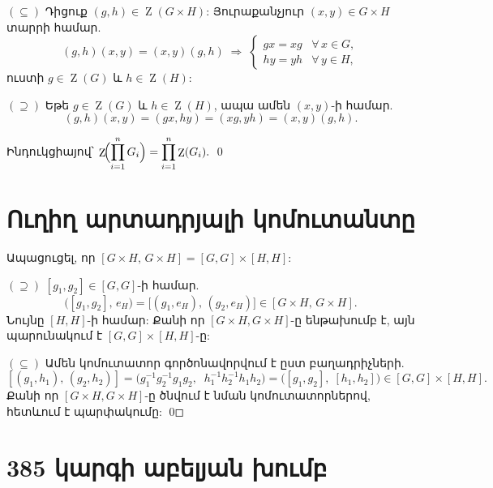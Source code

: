 \documentclass[12pt,a4paper]{article}
\newcommand{\armtext}{} %
\newenvironment{problem}{\begin{mdframed}[style=problemstyle]\armtext}{\end{mdframed}}
\newenvironment{sol}{\begin{mdframed}[style=solstyle]\armtext}{\end{mdframed}}
\DeclareMathOperator{\Cent}{Z}
\begin{document}
\begin{sol}
\noindent$(\subseteq)$\;
Դիցուք $(g,h) \in \Cent(G \times H)$:
Յուրաքանչյուր $(x,y) \in G \times H$ տարրի համար.
\[
  (g,h)(x,y) = (x,y)(g,h)
  \;\Longrightarrow\;
  \begin{cases} gx = xg & \forall\, x \in G,\\[2pt] hy = yh & \forall\, y \in H, \end{cases}
\]
ուստի $g \in \Cent(G)$ և $h \in \Cent(H)$:

\medskip
\noindent$(\supseteq)$\;
Եթե $g \in \Cent(G)$ և $h \in \Cent(H)$, ապա ամեն $(x,y)$-ի համար.
\[
  (g,h)(x,y) = (gx,hy) = (xg,yh) = (x,y)(g,h).
\]

Ինդուկցիայով՝ $\displaystyle\Cent\!\Bigl(\prod_{i=1}^{n} G_i\Bigr) = \prod_{i=1}^{n} \Cent(G_i).$ \qed
\end{sol}

\bigskip
\section{\armtext{Ուղիղ արտադրյալի կոմուտանտը}}

\begin{problem}
Ապացուցել, որ $[G \times H,\, G \times H] = [G,G] \times [H,H]$:
\end{problem}

\begin{sol}
\noindent$(\supseteq)$\;
$[g_1,g_2] \in [G,G]$-ի համար.
\[
  \bigl([g_1,g_2],\, e_H\bigr)
  = \bigl[(g_1,e_H),\,(g_2,e_H)\bigr]
  \in [G \times H,\, G \times H].
\]
Նույնը $[H,H]$-ի համար: Քանի որ $[G\times H, G\times H]$-ը ենթախումբ է, այն
պարունակում է $[G,G] \times [H,H]$-ը:

\medskip
\noindent$(\subseteq)$\;
Ամեն կոմուտատոր գործոնավորվում է ըստ բաղադրիչների.
\[
  [(g_1,h_1),\,(g_2,h_2)]
  = \bigl(g_1^{-1}g_2^{-1}g_1 g_2,\;\; h_1^{-1}h_2^{-1}h_1 h_2\bigr)
  = \bigl([g_1,g_2],\;[h_1,h_2]\bigr)
  \in [G,G] \times [H,H].
\]
Քանի որ $[G \times H, G \times H]$-ը ծնվում է նման կոմուտատորներով, հետևում է պարփակումը: \qed
\end{sol}

\bigskip
\section{\armtext{385 կարգի աբելյան խումբ}}
\end{document}
